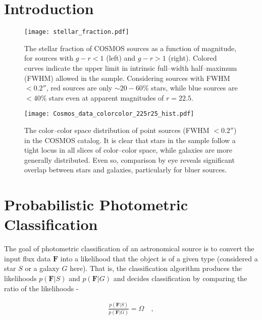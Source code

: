 \documentclass[12pt,preprint]{aastex}
\newcommand{\datavector}[1]{\boldsymbol{#1}}
\begin{document}
%
%
\section{Introduction}

\begin{figure}
\centering
\texttt{[image: stellar\_fraction.pdf]}
\caption{The stellar fraction of COSMOS sources as a function of magnitude, for sources with $g-r<1$ (left) and $g-r>1$ 
(right).  Colored curves indicate the upper limit in intrinsic full--width half--maximum (FWHM) allowed in the sample.  
Considering sources with FWHM $<0.2''$, red sources are only $\sim20-60\%$ stars, while blue sources are $<40\%$ 
stars even at apparent magnitudes of $r=22.5$.}
\label{fig:stellarfraction}
\end{figure}


\begin{figure}
\centering
\texttt{[image: Cosmos\_data\_colorcolor\_225r25\_hist.pdf]}
\caption{The color--color space distribution of point sources (FWHM $< 0.2''$) in the COSMOS catalog.  
It is clear that stars in the sample follow a tight locus in all slices of color--color space, while galaxies are 
more generally distributed.  Even so, comparison by eye reveals significant overlap between stars and 
galaxies, particularly for bluer sources.}
\label{fig:color-color-data}
\end{figure}


%
%
\section{Probabilistic Photometric Classification}

The goal of photometric classification of an astronomical source is 
to convert the input flux data $\datavector{F}$ into a likelihood that 
the object is of a given type (considered a star $S$ or a galaxy $G$ 
here).  That is, the classification algorithm produces the 
likelihoods $p(\datavector{F}|S)$ and $p(\datavector{F}|G)$ and 
decides classification by comparing the ratio of the likelihoods - 

\begin{eqnarray}\displaystyle
\frac{p(\datavector{F}|S)}{p(\datavector{F}|G)} = \Omega
\quad ,
\label{eqn:oddsratio}
\end{eqnarray}
\end{document}
